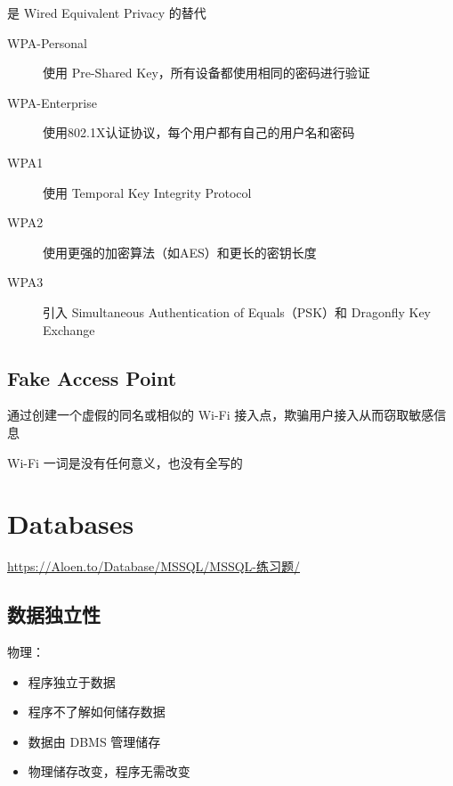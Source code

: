 \documentclass[11pt,journal,compsoc]{IEEEtran}
\begin{document}
是 Wired Equivalent Privacy 的替代

\begin{description}
    \item[WPA-Personal] 使用 Pre-Shared Key，所有设备都使用相同的密码进行验证

    \item[WPA-Enterprise] 使用802.1X认证协议，每个用户都有自己的用户名和密码
\end{description}

\begin{description}
    \item[WPA1] 使用 Temporal Key Integrity Protocol

    \item[WPA2] 使用更强的加密算法（如AES）和更长的密钥长度

    \item[WPA3] 引入 Simultaneous Authentication of Equals（PSK）和 Dragonfly Key Exchange
\end{description}


\subsection{Fake Access Point}

通过创建一个虚假的同名或相似的 Wi-Fi 接入点，欺骗用户接入从而窃取敏感信息

Wi-Fi 一词是没有任何意义，也没有全写的


\section{Databases}

\url{https://Aloen.to/Database/MSSQL/MSSQL-练习题/}

\subsection{数据独立性}

物理：

\begin{itemize}
    \item 程序独立于数据

    \item 程序不了解如何储存数据

    \item 数据由 DBMS 管理储存

    \item 物理储存改变，程序无需改变
\end{itemize}
\end{document}
